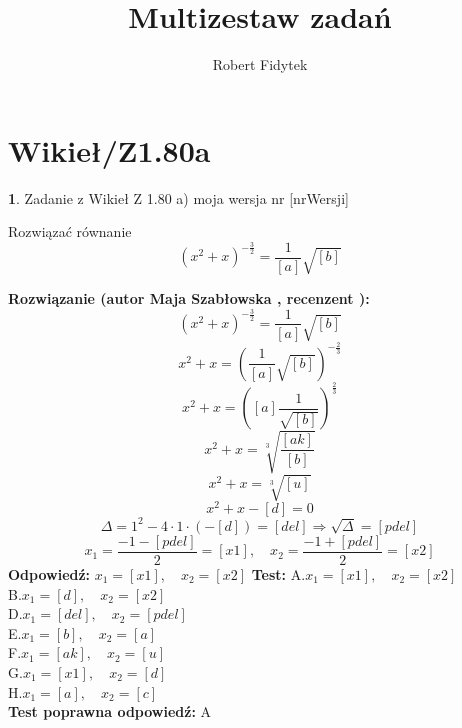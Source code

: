 \documentclass[12pt, a4paper]{article}
\title{Multizestaw zadań}
\author{Robert Fidytek}
\date{}
\theoremstyle{definition} %
\newtheorem{zad}{}
\newcommand{\kategoria}[1]{\section{#1}} %
\newcommand{\zadStart}[1]{\begin{zad}#1\newline} %
\newcommand{\zadStop}{\end{zad}}   %
\newcommand{\rozwStart}[2]{\noindent \textbf{Rozwiązanie (autor #1 , recenzent #2): }\newline} %
\newcommand{\rozwStop}{\newline}                                            %
\newcommand{\odpStart}{\noindent \textbf{Odpowiedź:}\newline}    %
\newcommand{\odpStop}{\newline}                                             %
\newcommand{\testStart}{\noindent \textbf{Test:}\newline} %
\newcommand{\testStop}{\newline} %
\newcommand{\kluczStart}{\noindent \textbf{Test poprawna odpowiedź:}\newline} %
\newcommand{\kluczStop}{\newline} %
\begin{document}
\maketitle


\kategoria{Wikieł/Z1.80a}
\zadStart{Zadanie z Wikieł Z 1.80 a)  moja wersja nr [nrWersji]}




Rozwiązać równanie 
$$(x^{2}+x)^{-\frac{3}{2}}=\frac{1}{[a]}\sqrt{[b]}$$
\zadStop

\rozwStart{Maja Szabłowska}{}
$$(x^{2}+x)^{-\frac{3}{2}}=\frac{1}{[a]}\sqrt{[b]}$$
$$x^{2}+x=\left(\frac{1}{[a]}\sqrt{[b]}\right)^{-\frac{2}{3}}$$
$$x^{2}+x=\left([a]\frac{1}{\sqrt{[b]}}\right)^{\frac{2}{3}}$$
$$x^{2}+x=\sqrt[3]{\frac{[ak]}{[b]}}$$
$$x^{2}+x=\sqrt[3]{[u]}$$
$$x^{2}+x-[d]=0$$
$$\Delta=1^2 - 4\cdot1\cdot(-[d])=[del]\Rightarrow \sqrt{\Delta}=[pdel]$$
$$x_{1}=\frac{-1-[pdel]}{2}=[x1], \quad x_{2}=\frac{-1+[pdel]}{2}=[x2]$$
\rozwStop
\odpStart
$x_{1}=[x1], \quad x_{2}=[x2]$
\odpStop
\testStart
A.$x_{1}=[x1], \quad x_{2}=[x2]$\\
B.$x_{1}=[d], \quad x_{2}=[x2]$\\
D.$x_{1}=[del], \quad x_{2}=[pdel]$\\
E.$x_{1}=[b], \quad x_{2}=[a]$\\
F.$x_{1}=[ak], \quad x_{2}=[u]$\\
G.$x_{1}=[x1], \quad x_{2}=[d]$\\
H.$x_{1}=[a], \quad x_{2}=[c]$\\
\testStop
\kluczStart
A
\kluczStop
\end{document}
